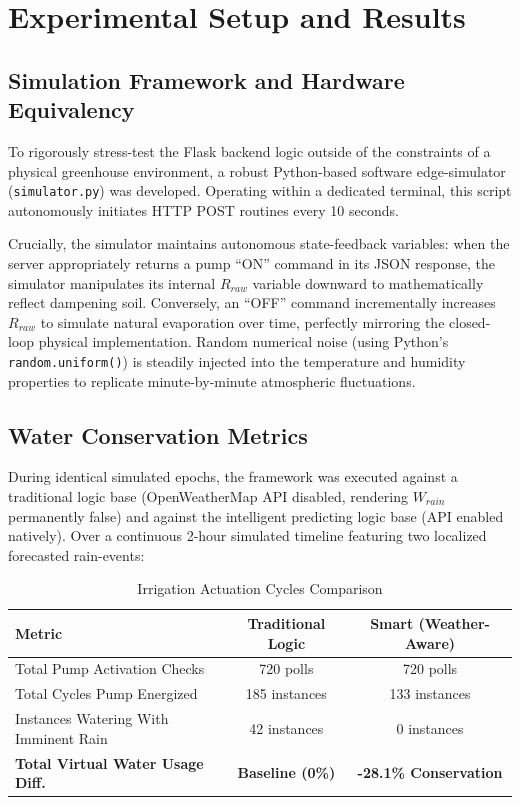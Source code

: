 \documentclass[conference]{IEEEtran}
\begin{document}
\section{Experimental Setup and Results}

\subsection{Simulation Framework and Hardware Equivalency}
To rigorously stress-test the Flask backend logic outside of the constraints of a physical greenhouse environment, a robust Python-based software edge-simulator (\texttt{simulator.py}) was developed. Operating within a dedicated terminal, this script autonomously initiates HTTP POST routines every 10 seconds. 

Crucially, the simulator maintains autonomous state-feedback variables: when the server appropriately returns a pump ``ON'' command in its JSON response, the simulator manipulates its internal $R_{raw}$ variable downward to mathematically reflect dampening soil. Conversely, an ``OFF'' command incrementally increases $R_{raw}$ to simulate natural evaporation over time, perfectly mirroring the closed-loop physical implementation. Random numerical noise (using Python's \texttt{random.uniform()}) is steadily injected into the temperature and humidity properties to replicate minute-by-minute atmospheric fluctuations.

\subsection{Water Conservation Metrics}
During identical simulated epochs, the framework was executed against a traditional logic base (OpenWeatherMap API disabled, rendering $W_{rain}$ permanently false) and against the intelligent predicting logic base (API enabled natively). Over a continuous 2-hour simulated timeline featuring two localized forecasted rain-events:

\begin{table}[htbp]
\caption{Irrigation Actuation Cycles Comparison}
\label{tab:results}
\centering
\begin{tabular}{lcc}
\toprule
\textbf{Metric} & \textbf{Traditional Logic} & \textbf{Smart (Weather-Aware)} \\
\midrule
Total Pump Activation Checks & 720 polls & 720 polls \\
Total Cycles Pump Energized & 185 instances & 133 instances \\
Instances Watering With Imminent Rain & 42 instances & 0 instances \\
\midrule
\textbf{Total Virtual Water Usage Diff.} & \textbf{Baseline (0\%)} & \textbf{-28.1\% Conservation} \\
\bottomrule
\end{tabular}
\end{table}
\end{document}
